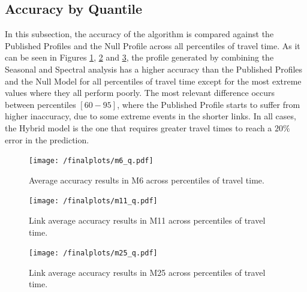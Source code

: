 \documentclass[conference]{IEEEtran}
\begin{document}
\subsection{Accuracy by Quantile}
In this subsection, the accuracy of the algorithm is compared against the Published Profiles and the Null Profile across all percentiles of travel time.
As it can be seen in Figures \ref{fig:m6q}, \ref{fig:m11q} and \ref{fig:m25q}, the profile generated by combining the Seasonal and Spectral analysis has a higher accuracy than the Published Profiles and the Null Model for all percentiles of travel time except for the most extreme values where they all perform poorly. 
The most relevant difference occurs between percentiles $[60-95]$, where the Published Profile starts to suffer from higher inaccuracy, due to some extreme events in the shorter links. 
In all cases, the Hybrid model is the one that requires greater travel times to reach a $20\%$ error in the prediction.
\begin{figure}[htbp]
	\centerline{\texttt{[image: /finalplots/m6\_q.pdf]}}
	\caption{Average accuracy results in M6 across percentiles of travel time.}
	\label{fig:m6q}
\end{figure}

\begin{figure}[htbp]
	\centering
	\texttt{[image: /finalplots/m11\_q.pdf]}
	\caption{Link average accuracy results in M11 across percentiles of travel time.}
	\label{fig:m11q}
\end{figure}

\begin{figure}[htbp]
	\centering
	\texttt{[image: /finalplots/m25\_q.pdf]}
	\caption{Link average accuracy results in M25 across percentiles of travel time.}
	\label{fig:m25q}
\end{figure}
\end{document}
